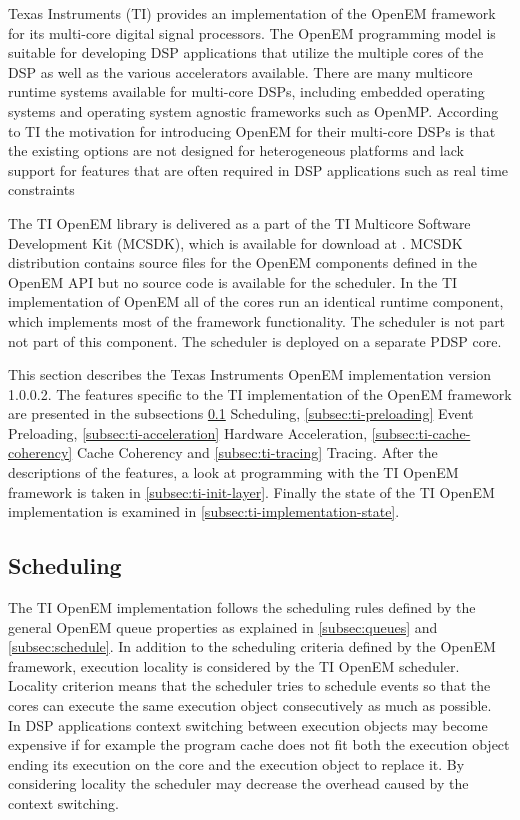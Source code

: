 Texas Instruments (TI) provides an implementation of the OpenEM framework for its multi-core digital signal processors. The OpenEM programming model is suitable for developing DSP applications that utilize the multiple cores of the DSP as well as the various accelerators available. There are many multicore runtime systems available for multi-core DSPs, including embedded operating systems and operating system agnostic frameworks such as OpenMP. According to TI the motivation for introducing OpenEM for their multi-core DSPs is that the existing options are not designed for heterogeneous platforms and lack support for features that are often required in DSP applications such as real time constraints~\cite{openemwhite}

The TI OpenEM library is delivered as a part of the TI Multicore Software Development Kit (MCSDK), which is available for download at \cite{mcsdkdown}. MCSDK distribution contains source files for the OpenEM components defined in the OpenEM API but no source code is available for the scheduler. In the TI implementation of OpenEM all of the cores run an identical runtime component, which implements most of the framework functionality. The scheduler is not part not part of this component. The scheduler is deployed on a separate PDSP core.

This section describes the Texas Instruments OpenEM implementation version 1.0.0.2. The features specific to the TI implementation of the OpenEM framework are presented in the subsections \ref{subsec:ti-scheduling} Scheduling, \ref{subsec:ti-preloading} Event Preloading, \ref{subsec:ti-acceleration} Hardware Acceleration, \ref{subsec:ti-cache-coherency} Cache Coherency and \ref{subsec:ti-tracing} Tracing. After the descriptions of the features, a look at programming with the TI OpenEM framework is taken in \ref{subsec:ti-init-layer}. Finally the state of the TI OpenEM implementation is examined in \ref{subsec:ti-implementation-state}.

\subsection{Scheduling}
\label{subsec:ti-scheduling}
The TI OpenEM implementation follows the scheduling rules defined by the general OpenEM queue properties as explained in \ref{subsec:queues} and \ref{subsec:schedule}. In addition to the scheduling criteria defined by the OpenEM framework, execution locality is considered by the TI OpenEM scheduler. Locality criterion means that the scheduler tries to schedule events so that the cores can execute the same execution object consecutively as much as possible.~\cite{openemwhite} In DSP applications context switching between execution objects may become expensive if for example the program cache does not fit both the execution object ending its execution on the core and the execution object to replace it. By considering locality the scheduler may decrease the overhead caused by the context switching.

